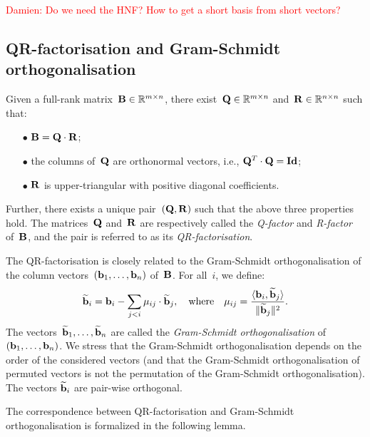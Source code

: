 \textcolor{red}{Damien: Do we need the HNF? How to get a short basis from short vectors?}



\subsection{QR-factorisation and Gram-Schmidt orthogonalisation}

Given a full-rank matrix~${\bf B} \in \mathbb{R}^{m \times n}$, there exist~${\bf Q} \in \mathbb{R}^{m \times n}$ 
and~${\bf R} \in \mathbb{R}^{n \times n}$ such that:
\begin{itemize}
\item[$\bullet$] ${\bf B} = {\bf Q} \cdot {\bf R}$;
\item[$\bullet$] the columns of~${\bf Q}$ are orthonormal vectors, i.e., ${\bf Q}^T \cdot {\bf Q} = {\bf Id}$;
\item[$\bullet$] ${\bf R}$ is upper-triangular with positive diagonal coefficients. 
\end{itemize}
Further, there exists a unique pair~$({\bf Q}, {\bf R})$ such that the above three properties hold. The matrices~${\bf Q}$ and~${\bf R}$ are respectively called the \emph{Q-factor} and \emph{R-factor} of~${\bf B}$, and the pair is referred to as its \emph{QR-factorisation}. 

The QR-factorisation is closely related to the Gram-Schmidt orthogonalisation of the column 
vectors~$({\bf b}_1,\ldots, {\bf b}_n)$ of~${\bf B}$. For all~$i$, we define:
\[
\widetilde{{\bf b}}_i = {\bf b}_i - \sum_{j <i} \mu_{ij}\cdot \widetilde{{\bf b}}_j, \ \ \mbox{ where } \ \ 
 \mu_{ij} = \frac{\ps{{\bf b}_i}{\widetilde{{\bf b}}_j}}{\|\widetilde{{\bf b}}_j\|^2}.
\]
The vectors~$\widetilde{{\bf b}}_1, \ldots, \widetilde{{\bf b}}_n$ are called the \emph{Gram-Schmidt orthogonalisation}
of~$({\bf b}_1,\ldots, {\bf b}_n)$. We stress that the Gram-Schmidt orthogonalisation depends on the order of the considered vectors
(and that the Gram-Schmidt orthogonalisation of permuted vectors is not the permutation of the Gram-Schmidt orthogonalisation). 
The vectors $\widetilde{{\bf b}}_i$ are pair-wise orthogonal. 

The correspondence between QR-factorisation and Gram-Schmidt orthogonalisation is formalized in the following lemma. 

